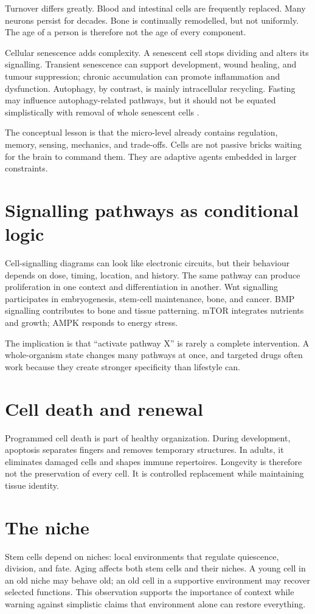 Turnover differs greatly. Blood and intestinal cells are frequently replaced. Many neurons persist for decades. Bone is continually remodelled, but not uniformly. The age of a person is therefore not the age of every component.

Cellular senescence adds complexity. A senescent cell stops dividing and alters its signalling. Transient senescence can support development, wound healing, and tumour suppression; chronic accumulation can promote inflammation and dysfunction. Autophagy, by contrast, is mainly intracellular recycling. Fasting may influence autophagy-related pathways, but it should not be equated simplistically with removal of whole senescent cells \autocite{levine2019autophagy}.

The conceptual lesson is that the micro-level already contains regulation, memory, sensing, mechanics, and trade-offs. Cells are not passive bricks waiting for the brain to command them. They are adaptive agents embedded in larger constraints.

\section{Signalling pathways as conditional logic}\label{signalling-pathways-as-conditional-logic}

Cell-signalling diagrams can look like electronic circuits, but their behaviour depends on dose, timing, location, and history. The same pathway can produce proliferation in one context and differentiation in another. Wnt signalling participates in embryogenesis, stem-cell maintenance, bone, and cancer. BMP signalling contributes to bone and tissue patterning. mTOR integrates nutrients and growth; AMPK responds to energy stress.

The implication is that ``activate pathway X'' is rarely a complete intervention. A whole-organism state changes many pathways at once, and targeted drugs often work because they create stronger specificity than lifestyle can.

\section{Cell death and renewal}\label{cell-death-and-renewal}

Programmed cell death is part of healthy organization. During development, apoptosis separates fingers and removes temporary structures. In adults, it eliminates damaged cells and shapes immune repertoires. Longevity is therefore not the preservation of every cell. It is controlled replacement while maintaining tissue identity.

\section{The niche}\label{the-niche}

Stem cells depend on niches: local environments that regulate quiescence, division, and fate. Aging affects both stem cells and their niches. A young cell in an old niche may behave old; an old cell in a supportive environment may recover selected functions. This observation supports the importance of context while warning against simplistic claims that environment alone can restore everything.
